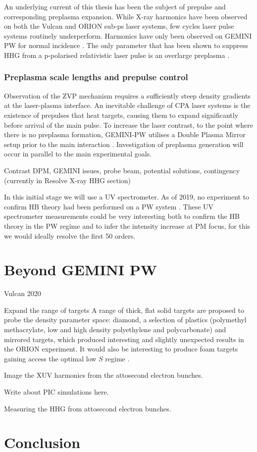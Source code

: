 An underlying current of this thesis has been the subject of prepulse and corresponding preplasma expansion. While X-ray harmonics have been observed on both the Vulcan \cite{dromeyBrightMultikeVHarmonic2007} and ORION sub-ps laser systems, few cycles laser pulse systems routinely underperform. Harmonics have only been observed on GEMINI PW for normal incidence \cite{dromeyCoherentSynchrotronEmission2013}. The only parameter that has been shown to suppress HHG from a p-polarised relativistic laser pulse is an overlarge preplasma \cite{dollarScalingHighorderHarmonic2013}. 



\subsubsection{Preplasma scale lengths and prepulse control}
Observation of the ZVP mechanism requires a sufficiently steep density gradients at the laser-plasma interface. An inevitable challenge of \ac{CPA} laser systems is the existence of prepulses that heat targets, causing them to expand significantly before arrival of the main pulse. To increase the laser contrast, to the point where there is no preplasma formation, GEMINI-PW utilises a Double Plasma Mirror setup prior to the main interaction \cite{doumyCompleteCharacterizationPlasma2004}. Investigation of preplasma generation will occur in parallel to the main experimental goals.

Contrast DPM, GEMINI issues, probe beam, potential solutions, contingency (currently in Resolve X-ray HHG section)




In this initial stage we will use a UV spectrometer. As of 2019, no experiment to confirm HB theory had been performed on a PW system \cite{vincentiAchievingExtremeLight2019}. These UV spectrometer measurements could be very interesting both to confirm the HB theory in the PW regime and to infer the intensity increase at PM focus, for this we would ideally resolve the first 50 orders.


\section{Beyond GEMINI PW}
Vulcan 2020

Expand the range of targets A range of thick, flat solid targets are proposed to probe the density parameter space: diamond, a selection of plastics (polymethyl methacrylate, low and high density polyethylene and polycarbonate) and mirrored targets, which produced interesting and slightly unexpected results in the ORION experiment. It would also be interesting to produce foam targets gaining access the optimal low $S$ regime \cite{bataniPhysicsIssuesShock2014}.

Image the XUV harmonics from the attosecond electron bunches.

Write about PIC simulations here.

Measuring the HHG from attosecond electron bunches.


\section{Conclusion}







